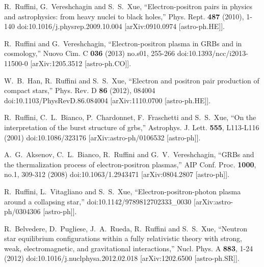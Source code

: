 \documentclass[universe,article,submit,moreauthors,pdftex,a4paper]{Definitions/mdpi}
\begin{document}
\begin{thebibliography}{99}

R.~Ruffini, G.~Vereshchagin and S.~S.~Xue,
``Electron-positron pairs in physics and astrophysics: from heavy nuclei to black holes,''
Phys. Rept. \textbf{487} (2010), 1-140
doi:10.1016/j.physrep.2009.10.004
[arXiv:0910.0974 [astro-ph.HE]].

R.~Ruffini and G.~Vereshchagin,
``Electron-positron plasma in GRBs and in cosmology,''
Nuovo Cim. C \textbf{036} (2013) no.s01, 255-266
doi:10.1393/ncc/i2013-11500-0
[arXiv:1205.3512 [astro-ph.CO]].

W.~B.~Han, R.~Ruffini and S.~S.~Xue,
``Electron and positron pair production of compact stars,''
Phys. Rev. D \textbf{86} (2012), 084004
doi:10.1103/PhysRevD.86.084004
[arXiv:1110.0700 [astro-ph.HE]].

R.~Ruffini, C.~L.~Bianco, P.~Chardonnet, F.~Fraschetti and S.~S.~Xue,
``On the interpretation of the burst structure of grbs,''
Astrophys. J. Lett. \textbf{555}, L113-L116 (2001)
doi:10.1086/323176
[arXiv:astro-ph/0106532 [astro-ph]].

A.~G.~Aksenov, C.~L.~Bianco, R.~Ruffini and G.~V.~Vereshchagin,
``GRBs and the thermalization process of electron-positron plasmas,''
AIP Conf. Proc. \textbf{1000}, no.1, 309-312 (2008)
doi:10.1063/1.2943471
[arXiv:0804.2807 [astro-ph]].


R.~Ruffini, L.~Vitagliano and S.~S.~Xue,
``Electron-positron-photon plasma around a collapsing star,''
doi:10.1142/9789812702333\_0030
[arXiv:astro-ph/0304306 [astro-ph]].

R.~Belvedere, D.~Pugliese, J.~A.~Rueda, R.~Ruffini and S.~S.~Xue,
``Neutron star equilibrium configurations within a fully relativistic theory with strong, weak, electromagnetic, and gravitational interactions,''
Nucl. Phys. A \textbf{883}, 1-24 (2012)
doi:10.1016/j.nuclphysa.2012.02.018
[arXiv:1202.6500 [astro-ph.SR]].


\end{thebibliography}
\end{document}
